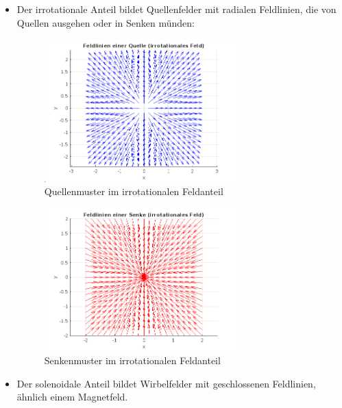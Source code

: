 \begin{itemize}
\item Der irrotationale Anteil bildet Quellenfelder mit radialen Feldlinien, die von Quellen ausgehen oder in Senken münden:
 
\begin{figure}
\centering
\includegraphics[width=0.7\textwidth]{papers/helmholtz/images/Quelle.png}
\caption{Quellenmuster im irrotationalen Feldanteil}
\label{fig:quelle}
\end{figure}
 
\begin{figure}
\centering
\includegraphics[width=0.7\textwidth]{papers/helmholtz/images/Senke.png}
\caption{Senkenmuster im irrotationalen Feldanteil}
\label{fig:senke}
\end{figure}
 
\item Der solenoidale Anteil bildet Wirbelfelder mit geschlossenen Feldlinien, ähnlich einem Magnetfeld.
\end{itemize}
  
